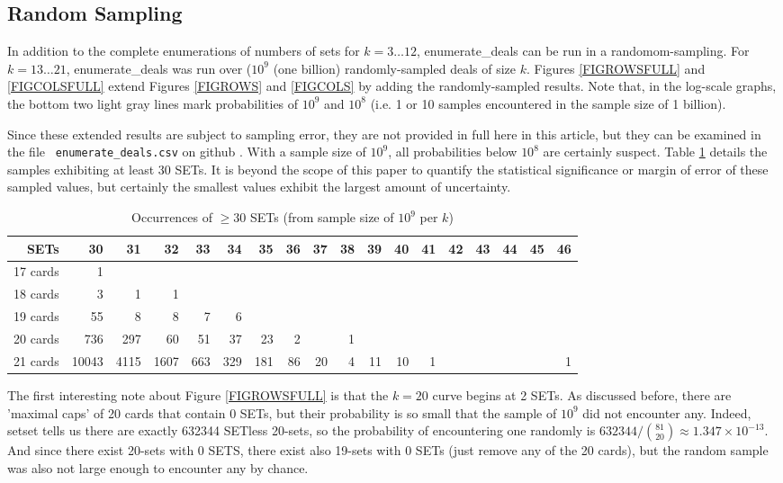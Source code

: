 \documentclass[10pt]{amsart}
\newcommand{\SETSETb}{{\sc setset }}
\newcommand{\EDb}{{\sc enumerate\_deals }}
\begin{document}
\subsection{Random Sampling}
In addition to the complete enumerations of numbers of sets for $k=3\ldots 12$,
\EDb can be run in a randomom-sampling. For $k=13\ldots 21$, \EDb was run over
($10^9$ (one billion) randomly-sampled deals of size $k$. Figures
\ref{FIGROWSFULL} and \ref{FIGCOLSFULL} extend Figures \ref{FIGROWS} and
\ref{FIGCOLS} by adding the randomly-sampled results. Note that, in the
log-scale graphs, the bottom two light gray lines mark probabilities of $10^9$
and $10^8$ (i.e. 1 or 10 samples encountered in the sample size of 1 billion). 

Since these extended results are subject to sampling error, they are not
provided in full here in this article, but they can be examined in the file {\tt
  enumerate\_deals.csv} on github \cite{ME}. With a sample size of $10^9$, all
probabilities below $10^8$ are certainly suspect. Table \ref{LOTSASETS} details
the samples exhibiting at least 30 SETs. It is beyond the scope of this paper to
quantify the statistical significance or margin of error of these sampled
values, but certainly the smallest values exhibit the largest amount of
uncertainty.

\begin{table}
  \caption{Occurrences of $\ge 30$ SETs (from sample size of $10^9$ per $k$)}
  \label{LOTSASETS}
  \centering
  \begin{tabular}{r | r r r r r r r r r r r r r r r r r }
    SETs    & 30&31&32&33&34&35&36&37&38&39&40&41&42&43&44&45&46 \\
    \hline
    17 cards& 1\\
    18 cards& 3 & 1 & 1\\
    19 cards& 55&8&8&7&6\\
    20 cards& 736 & 297 & 60 & 51 & 37 & 23 & 2 & & 1 \\
    21 cards& 10043 & 4115 & 1607 & 663 & 329 & 181 & 86 & 20 & 4 & 11 & 10 & 1 &&&&& 1
  \end{tabular}
\end{table}

The first interesting note about Figure \ref{FIGROWSFULL} is that the $k=20$
curve begins at 2 SETs. As discussed before, there are 'maximal caps' of 20
cards that contain 0 SETs, but their probability is so small that the sample of
$10^9$ did not encounter any. Indeed, \SETSETb tells us there are exactly 632344
SETless 20-sets, so the probability of encountering one randomly is
$632344/\binom{81}{20}\approx1.347\times 10^{-13}$. And since there exist
20-sets with 0 SETS, there exist also 19-sets with 0 SETs (just remove any of
the 20 cards), but the random sample was also not large enough to encounter
any by chance.
\end{document}
